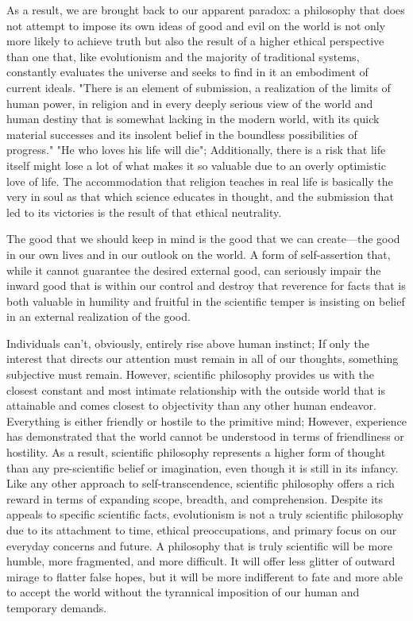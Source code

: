 \documentclass[a4paper,12pt]{book}[2004/02/16]
\theoremstyle{ilemma}
\theoremstyle{itheorem}
\theoremstyle{iother}
\theoremstyle{icorollary}
\theoremstyle{numcorollary}
\theoremstyle{idefinition}
\begin{document}
As a result, we are brought back to our apparent paradox: a philosophy that does not attempt to impose its own ideas of good and evil on the world is not only more likely to achieve truth but also the result of a higher ethical perspective than one that, like evolutionism and the majority of traditional systems, constantly evaluates the universe and seeks to find in it an embodiment of current ideals. "There is an element of submission, a realization of the limits of human power, in religion and in every deeply serious view of the world and human destiny that is somewhat lacking in the modern world, with its quick material successes and its insolent belief in the boundless possibilities of progress." "He who loves his life will die"; Additionally, there is a risk that life itself might lose a lot of what makes it so valuable due to an overly optimistic love of life. The accommodation that religion teaches in real life is
basically the very in soul as that which science educates in
thought, and the submission that led to its victories is the result of that ethical neutrality.

The good that we should keep in mind is the good that we can create—the good in our own lives and in our outlook on the world. A form of self-assertion that, while it cannot guarantee the desired external good, can seriously impair the inward good that is within our control and destroy that reverence for facts that is both valuable in humility and fruitful in the scientific temper is insisting on belief in an external realization of the good.

Individuals can't, obviously, entirely rise above human instinct;
If only the interest that directs our attention must remain in all of our thoughts, something subjective must remain. However, scientific philosophy provides us with the closest constant and most intimate relationship with the outside world that is attainable and comes closest to objectivity than any other human endeavor.
Everything is either friendly or hostile to the primitive mind; However, experience has demonstrated that the world cannot be understood in terms of friendliness or hostility. As a result, scientific philosophy represents a higher form of thought than any pre-scientific belief or imagination, even though it is still in its infancy. Like any other approach to self-transcendence, scientific philosophy offers a rich reward in terms of expanding scope, breadth, and comprehension. Despite its appeals to specific scientific facts, evolutionism is not a truly scientific philosophy due to its attachment to time, ethical preoccupations, and primary focus on our everyday concerns and future. A philosophy that is truly scientific will be more humble, more fragmented, and more difficult. It will offer less glitter of outward mirage to flatter false hopes, but it will be more indifferent to fate and more able to accept the world without the tyrannical imposition of our human and temporary demands.
\end{document}
